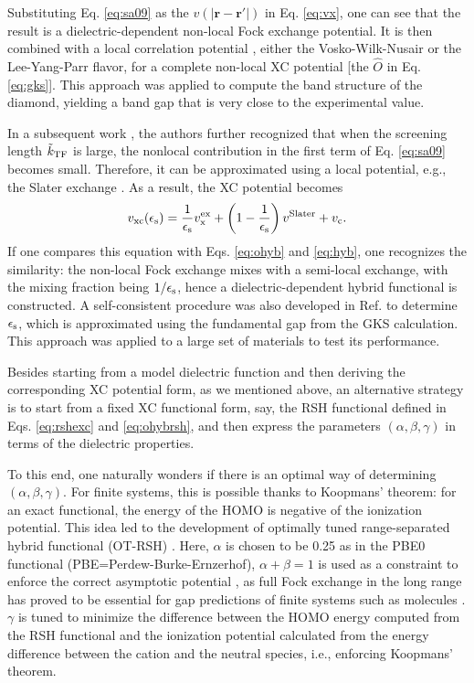 \documentclass[aip, amsmath, amssymb, reprint, longbibliography]{revtex4-2}
\def\mr{\mathbf{r}}
\begin{document}
Substituting Eq. \eqref{eq:sa09} as the $v(|\mr-\mr'|)$ in Eq. \eqref{eq:vx}, one can see that the result is a dielectric-dependent non-local Fock exchange potential. It is then combined with a local correlation potential \cite{SA08}, either the Vosko-Wilk-Nusair or the Lee-Yang-Parr flavor, for a complete non-local XC potential [the $\hat{O}$ in Eq. \eqref{eq:gks}]. This approach was applied to compute the band structure of the diamond, yielding a band gap that is very close to the experimental value.

In a subsequent work \cite{SA09}, the authors further recognized that when the screening length $\tilde{k}_{\rm TF}$ is large, the nonlocal contribution in the first term of Eq. \eqref{eq:sa09} becomes small. Therefore, it can be approximated using a local potential, e.g., the Slater exchange \cite{S51}. As a result, the XC potential becomes
\begin{equation}
v_{\rm xc}(\epsilon_{\rm s})=\frac{1}{\epsilon_{\rm s}}v^{\rm ex}_{\rm x}+\left(1-\frac{1}{\epsilon_{\rm s}}\right)v^{\rm Slater}+v_{\rm c}.
\label{eq:sa09b}
\end{equation}
If one compares this equation with Eqs. \eqref{eq:ohyb} and \eqref{eq:hyb}, one recognizes the similarity: the non-local Fock exchange mixes with a semi-local exchange, with the mixing fraction being $1/\epsilon_{\rm s}$, hence a dielectric-dependent hybrid functional is constructed. A self-consistent procedure was also developed in Ref.  to determine $\epsilon_{\rm s}$, which is approximated using the fundamental gap from the GKS calculation. This approach was applied to a large set of materials \cite{SA10} to test its performance.

Besides starting from a model dielectric function and then deriving the corresponding XC potential form, as we mentioned above, an alternative strategy is to start from a fixed XC functional form, say, the RSH functional defined in Eqs. \eqref{eq:rshexc} and \eqref{eq:ohybrsh}, and then express the parameters $(\alpha,\beta,\gamma)$ in terms of the dielectric properties.

To this end, one naturally wonders if there is an optimal way of determining $(\alpha,\beta,\gamma)$. For finite systems, this is possible thanks to Koopmans' theorem: for an exact functional, the energy of the HOMO is negative of the ionization potential. This idea led to the development of optimally tuned range-separated hybrid functional (OT-RSH) \cite{RSGA12}. Here, $\alpha$ is chosen to be 0.25 as in the PBE0 functional (PBE=Perdew-Burke-Ernzerhof), $\alpha+\beta=1$ is used as a constraint to enforce the correct asymptotic potential \cite{RH08}, as full Fock exchange in the long range has proved to be essential for gap predictions of finite systems such as molecules \cite{KSRB12}. $\gamma$ is tuned to minimize the difference between the HOMO energy computed from the RSH functional and the ionization potential calculated from the energy difference between the cation and the neutral species, i.e., enforcing Koopmans' theorem.
\end{document}
